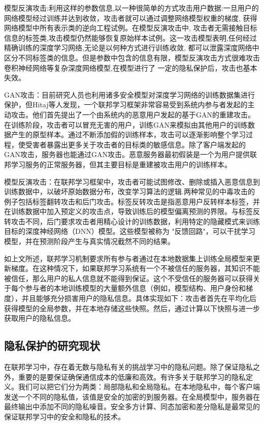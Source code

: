 模型反演攻击:\cite{ref7}利用这样的参数信息,以一种很简单的方式攻击用户数据:一旦用户的网络模型经过训练并达到收敛，攻击者就可以通过调整网络模型权重的梯度, 获得网络模型中所有表示类的逆向工程试例。在模型反演攻击中, 攻击者无需接触目标信息的标签类,攻击模型仍然能够恢复原始样本试例。这一攻击模型表明,任何经过精确训练的深度学习网络,无论是以何种方式进行训练收敛, 都可以泄露深度网络中区分不同标签类的信息。但是参数中包含的信息有限，模型反演攻击方式很难攻击卷积神经网络等复杂深度网络模型,在模型进行了 一定的隐私保护后，攻击也基本失效。

GAN攻击：目前研究人员也利用诸多安全模型对深度学习网络的训练数据集进行保护，但Hitaj等人\cite{ref8}发现，一个联邦学习框架非常容易受到系统内参与者发起的主动攻击。他们首先提出了一个由系统内的恶意用户发起的基于GAN的重建攻击。在训练阶段，攻击者可以冒充无害的用户，训练GAN来模拟由其他用户的训练数据产生的原型样本。通过不断添加假的训练样本，攻击可以逐渐影响整个学习过程，使受害者暴露出更多关于攻击者的目标类的敏感信息。除了客户端发起的GAN攻击，服务器也能通过GAN攻击。恶意服务器最初假装是一个为用户提供联邦学习服务的正常服务器，但其主要目标是重建被攻击用户的训练样本。

模型反演攻击：在联邦学习框架中，攻击者可能试图修改、删除或插入恶意信息到训练数据中，以破坏原始数据分布，改变学习算法的逻辑.两种常见的中毒攻击的例子包括标签翻转攻击\cite{ref9}和后门攻击\cite{ref10}。标签反转攻击是指恶意用户反转样本标签，并在训练数据中加入预定义的攻击点，导致训练后的模型偏离预测的界限。与标签反转攻击不同，后门要求攻击者用精心设计的训练数据，利用特定的隐藏模式来训练目标的深度神经网络（DNN）模型。这些模型被称为 "反馈回路"，可以干扰学习模型，并在预测阶段产生与真实情况截然不同的结果。

如上文所述，联邦学习机制要求所有参与者通过在本地数据集上训练全局模型来更新梯度。在这种情况下，如果联邦学习系统有一个不被信任的服务器，其知识不能被信任，那么用户的私人信息就不能得到保证。这个不受信任的服务器可以获得关于每个参与者的本地训练模型的大量额外信息（例如，模型结构、用户身份和梯度），并且能够充分损害用户的隐私信息。具体实现如下：攻击者首先在平均化后获得模型的全局参数，并在本地存储这些快照。然后，通过计算以下快照与进一步获取用户的隐私信息。

\subsection{隐私保护的研究现状}
在联邦学习中，存在着无数与隐私有关的挑战学习中的隐私问题。除了保证隐私之外，重要的是要保证确保通信成本的低廉和高效。有许多关于联邦学习的隐私定义\cite{ref11}\cite{ref12}\cite{ref13}。我们可以把它们分为两类：局部隐私和全局隐私。在本地隐私中，每个客户端发送一个不同的隐私值，该值是安全的加密的到服务器。在全局模型中，服务器在最终输出中添加不同的隐私噪音。安全多方计算、同态加密和差分隐私是最常见的保证联邦学习中的安全和隐私的技术。

